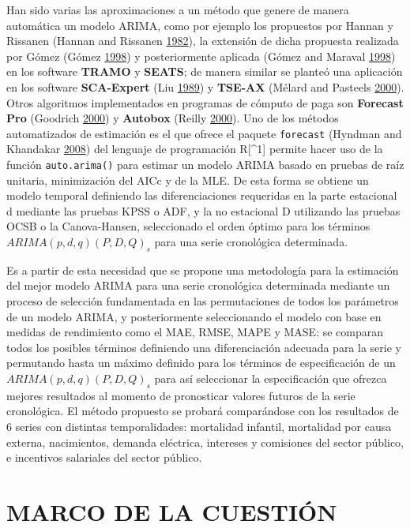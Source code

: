 \documentclass[12pt]{article}
\begin{document}
Han sido varias las aproximaciones a un método que genere de manera
automática un modelo ARIMA, como por ejemplo los propuestos por Hannan y
Rissanen (Hannan and Rissanen \protect\hyperlink{ref-hannan}{1982}), la
extensión de dicha propuesta realizada por Gómez (Gómez
\protect\hyperlink{ref-gomez}{1998}) y posteriormente aplicada (Gómez
and Maraval \protect\hyperlink{ref-tramo}{1998}) en los software
\textbf{TRAMO} y \textbf{SEATS}; de manera similar se planteó una
aplicación en los software \textbf{SCA-Expert} (Liu
\protect\hyperlink{ref-liu}{1989}) y \textbf{TSE-AX} (Mélard and
Pasteels \protect\hyperlink{ref-melard}{2000}). Otros algoritmos
implementados en programas de cómputo de paga son \textbf{Forecast Pro}
(Goodrich \protect\hyperlink{ref-forecastpro}{2000}) y \textbf{Autobox}
(Reilly \protect\hyperlink{ref-autobox}{2000}). Uno de los métodos
automatizados de estimación es el que ofrece el paquete
\texttt{forecast} (Hyndman and Khandakar
\protect\hyperlink{ref-auto.arima}{2008}) del lenguaje de programación
R{[}\^{}1{]} permite hacer uso de la función \texttt{auto.arima()} para
estimar un modelo ARIMA basado en pruebas de raíz unitaria, minimización
del AICc y de la MLE. De esta forma se obtiene un modelo temporal
definiendo las diferenciaciones requeridas en la parte estacional d
mediante las pruebas KPSS o ADF, y la no estacional D utilizando las
pruebas OCSB o la Canova-Hansen, seleccionado el orden óptimo para los
términos \(ARIMA(p,d,q)(P,D,Q)_s\) para una serie cronológica
determinada.

Es a partir de esta necesidad que se propone una metodología para la
estimación del mejor modelo ARIMA para una serie cronológica determinada
mediante un proceso de selección fundamentada en las permutaciones de
todos los parámetros de un modelo ARIMA, y posteriormente seleccionando
el modelo con base en medidas de rendimiento como el MAE, RMSE, MAPE y
MASE: se comparan todos los posibles términos definiendo una
diferenciación adecuada para la serie y permutando hasta un máximo
definido para los términos de especificación de un
\(ARIMA(p,d,q)(P,D,Q)_s\) para así seleccionar la especificación que
ofrezca mejores resultados al momento de pronosticar valores futuros de
la serie cronológica. El método propuesto se probará comparándose con
los resultados de 6 series con distintas temporalidades: mortalidad
infantil, mortalidad por causa externa, nacimientos, demanda eléctrica,
intereses y comisiones del sector público, e incentivos salariales del
sector público.

\section{MARCO DE LA CUESTIÓN}
\end{document}
